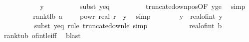 \begin{isabellebody}
\ \ \ \ \ \ \isamarkupfalse%
\ \isamarkupfalse%
\ {\isachardoublequoteopen}{\isachardot}{\kern0pt}{\isachardot}{\kern0pt}{\isachardot}{\kern0pt}\ {\isasymle}\ y{\isacharprime}{\kern0pt}{\isachardoublequoteclose}\isanewline
\ \ \ \ \ \ \ \ \isamarkupfalse%
\ {\isacharparenleft}{\kern0pt}subst\ y{\isacharprime}{\kern0pt}{\isacharunderscore}{\kern0pt}eq{\isacharparenright}{\kern0pt}\isanewline
\ \ \ \ \ \ \ \ \isamarkupfalse%
\ truncate{\isacharunderscore}{\kern0pt}down{\isacharunderscore}{\kern0pt}pos{\isacharbrackleft}{\kern0pt}OF\ y{\isacharunderscore}{\kern0pt}ge{\isacharunderscore}{\kern0pt}{}{\isacharbrackright}{\kern0pt}\ \isamarkupfalse%
\ simp\isanewline
\ \ \ \ \ \ \isamarkupfalse%
\ \isamarkupfalse%
\ rank{\isacharunderscore}{\kern0pt}t{\isacharunderscore}{\kern0pt}lb{\isacharprime}{\kern0pt}{\isacharcolon}{\kern0pt}\ {\isachardoublequoteopen}{\isacharparenleft}{\kern0pt}a{\isacharplus}{\kern0pt}{}{\isacharparenright}{\kern0pt}\ {\isacharasterisk}{\kern0pt}\ {\isacharparenleft}{\kern0pt}{}\ {\isacharminus}{\kern0pt}\ {}\ powr\ {\isacharparenleft}{\kern0pt}{\isacharminus}{\kern0pt}real\ r{\isacharparenright}{\kern0pt}{\isacharparenright}{\kern0pt}\ {\isasymle}\ y{\isacharprime}{\kern0pt}{\isachardoublequoteclose}\ \isamarkupfalse%
\ simp\isanewline
\isanewline
\ \ \ \ \ \ \isamarkupfalse%
\ {\isachardoublequoteopen}y{\isacharprime}{\kern0pt}\ {\isasymle}\ real{\isacharunderscore}{\kern0pt}of{\isacharunderscore}{\kern0pt}int\ y{\isachardoublequoteclose}\isanewline
\ \ \ \ \ \ \ \ \isamarkupfalse%
\ {\isacharparenleft}{\kern0pt}subst\ y{\isacharprime}{\kern0pt}{\isacharunderscore}{\kern0pt}eq{\isacharcomma}{\kern0pt}\ rule\ truncate{\isacharunderscore}{\kern0pt}down{\isacharunderscore}{\kern0pt}le{\isacharcomma}{\kern0pt}\ simp{\isacharparenright}{\kern0pt}\isanewline
\ \ \ \ \ \ \isamarkupfalse%
\ \isamarkupfalse%
\ {\isachardoublequoteopen}{\isachardot}{\kern0pt}{\isachardot}{\kern0pt}{\isachardot}{\kern0pt}\ {\isasymle}\ real{\isacharunderscore}{\kern0pt}of{\isacharunderscore}{\kern0pt}int\ b{\isachardoublequoteclose}\isanewline
\ \ \ \ \ \ \ \ \isamarkupfalse%
\ rank{\isacharunderscore}{\kern0pt}t{\isacharunderscore}{\kern0pt}ub\ of{\isacharunderscore}{\kern0pt}int{\isacharunderscore}{\kern0pt}le{\isacharunderscore}{\kern0pt}iff\ \isamarkupfalse%
\ blast\isanewline
\ \ \ \ \ \ \isamarkupfalse%

\end{isabellebody}
